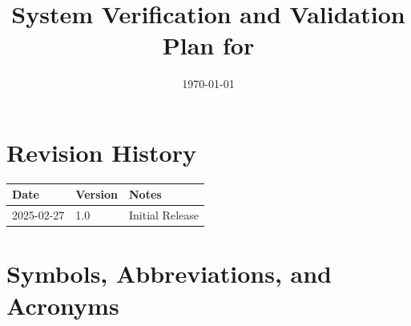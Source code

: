 \documentclass[12pt, titlepage]{article}
\begin{document}
\title{System Verification and Validation Plan for \progname{}} 
\author{\authname}
\date{\today}
	
\maketitle


\section*{Revision History}

\begin{tabularx}{\textwidth}{p{3cm}p{2cm}X}
\toprule {\bf Date} & {\bf Version} & {\bf Notes}\\
\midrule
2025-02-27 & 1.0 & Initial Release\\
\bottomrule
\end{tabularx}

\newpage

\tableofcontents
\listoftables

\listoffigures

\newpage
\section{Symbols, Abbreviations, and Acronyms}
\end{document}
